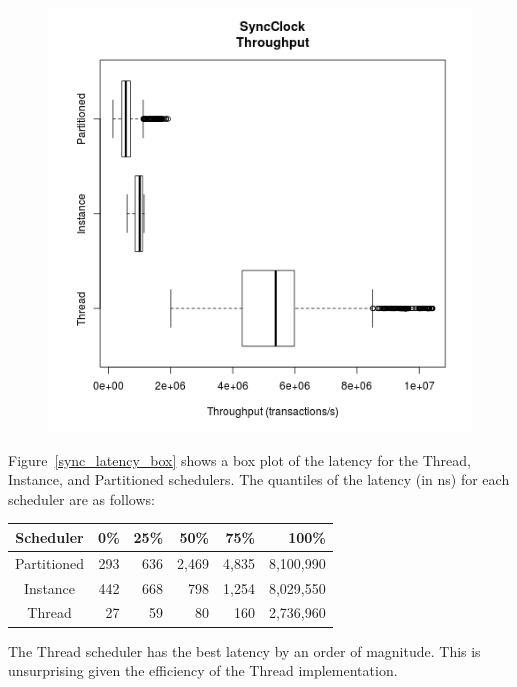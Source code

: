 \begin{figure}
\center
\includegraphics[height=.4\textheight]{sync_throughput_box.png}
\caption{\label{sync_throughput_box}}
\end{figure}

Figure~\ref{sync_latency_box} shows a box plot of the latency for the Thread, Instance, and Partitioned schedulers.
The quantiles of the latency (in ns) for each scheduler are as follows:
\begin{center}
\begin{tabular}{crrrrr}
Scheduler &       0\%  &    25\%  &    50\%  &    75\%  &   100\% \\
\hline
Partitioned & 293 &   636 & 2,469 & 4,835 &  8,100,990 \\
Instance    & 442 &   668 &   798 & 1,254 &  8,029,550 \\
Thread      &  27 &    59 &    80 &   160 &  2,736,960 \\
\end{tabular}
\end{center}
The Thread scheduler has the best latency by an order of magnitude.
This is unsurprising given the efficiency of the Thread implementation.


